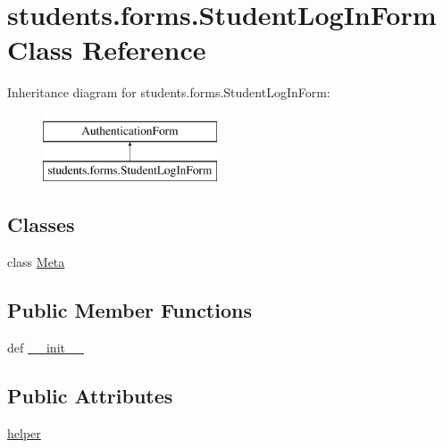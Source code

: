 \hypertarget{classstudents_1_1forms_1_1_student_log_in_form}{\section{students.\-forms.\-Student\-Log\-In\-Form Class Reference}
\label{classstudents_1_1forms_1_1_student_log_in_form}
}
Inheritance diagram for students.\-forms.\-Student\-Log\-In\-Form\-:\begin{figure}[H]
\begin{center}
\leavevmode
\includegraphics[height=2.000000cm]{classstudents_1_1forms_1_1_student_log_in_form}
\end{center}
\end{figure}
\subsection*{Classes}
\begin{DoxyCompactItemize}
\item 
class \hyperlink{classstudents_1_1forms_1_1_student_log_in_form_1_1_meta}{Meta}
\end{DoxyCompactItemize}
\subsection*{Public Member Functions}
\begin{DoxyCompactItemize}
\item 
def \hyperlink{classstudents_1_1forms_1_1_student_log_in_form_a00a3aca2c23b93a806a8e0a908e5cd14}{\-\_\-\-\_\-init\-\_\-\-\_\-}
\end{DoxyCompactItemize}
\subsection*{Public Attributes}
\begin{DoxyCompactItemize}
\item 
\hyperlink{classstudents_1_1forms_1_1_student_log_in_form_a326cea774299d9fa1e8bcf89644c7c49}{helper}
\end{DoxyCompactItemize}


